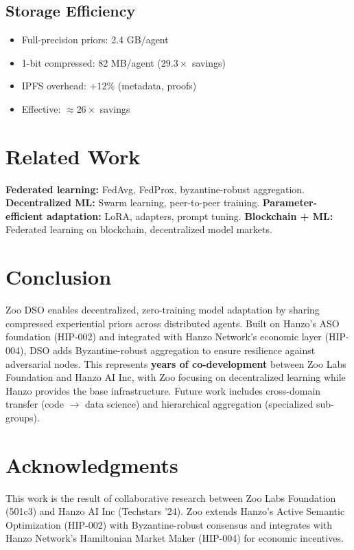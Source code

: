 \documentclass[11pt]{article}
\begin{document}
\subsection{Storage Efficiency}
\begin{itemize}[leftmargin=1.1em]
  \item Full-precision priors: 2.4 GB/agent
  \item 1-bit compressed: 82 MB/agent (\(29.3\times\) savings)
  \item IPFS overhead: +12\% (metadata, proofs)
  \item Effective: \(\approx 26\times\) savings
\end{itemize}

\section{Related Work}
\textbf{Federated learning:} FedAvg, FedProx, byzantine-robust aggregation. \textbf{Decentralized ML:} Swarm learning, peer-to-peer training. \textbf{Parameter-efficient adaptation:} LoRA, adapters, prompt tuning. \textbf{Blockchain + ML:} Federated learning on blockchain, decentralized model markets.

\section{Conclusion}
Zoo DSO enables decentralized, zero-training model adaptation by sharing compressed experiential priors across distributed agents. Built on Hanzo's ASO foundation (HIP-002) and integrated with Hanzo Network's economic layer (HIP-004), DSO adds Byzantine-robust aggregation to ensure resilience against adversarial nodes. This represents \textbf{years of co-development} between Zoo Labs Foundation and Hanzo AI Inc, with Zoo focusing on decentralized learning while Hanzo provides the base infrastructure. Future work includes cross-domain transfer (code \(\to\) data science) and hierarchical aggregation (specialized sub-groups).

\section*{Acknowledgments}
This work is the result of collaborative research between Zoo Labs Foundation (501c3) and Hanzo AI Inc (Techstars '24). Zoo extends Hanzo's Active Semantic Optimization (HIP-002) with Byzantine-robust consensus and integrates with Hanzo Network's Hamiltonian Market Maker (HIP-004) for economic incentives.
\end{document}

